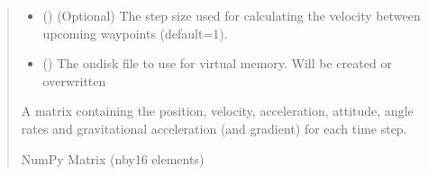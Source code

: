 \documentclass[letterpaper,10pt,english]{sphinxmanual}
\begin{document}
\begin{fulllineitems}
\begin{quote}
\begin{description}
\begin{itemize}
\item {} 
\sphinxAtStartPar
{} () \textendash{} (Optional) The step size used for calculating the
velocity between upcoming waypoints (default=1).

\item {} 
\sphinxAtStartPar
{} () \textendash{} The on\sphinxhyphen{}disk file to use for virtual memory.
Will be created or overwritten

\end{itemize}

\sphinxAtStartPar
A matrix containing the position, velocity, acceleration,
attitude, angle rates and gravitational acceleration (and gradient)
for each time step.

\sphinxAtStartPar
NumPy Matrix (n\sphinxhyphen{}by\sphinxhyphen{}16 elements)

\end{description}\end{quote}

\end{fulllineitems}

\end{document}
